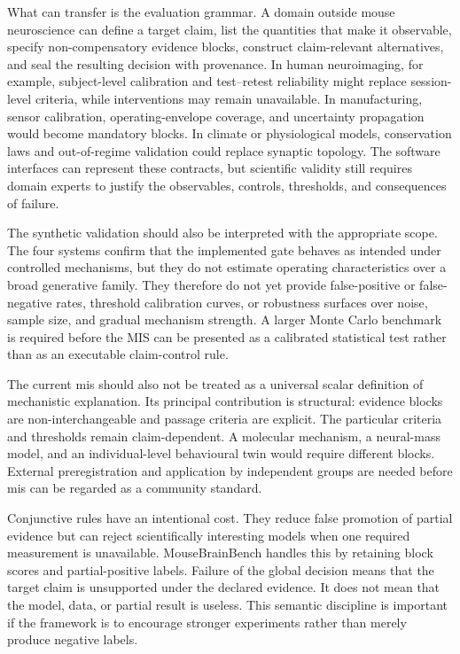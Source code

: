 \documentclass[a4paper,fleqn]{cas-sc}
\begin{document}
What can transfer is the evaluation grammar. A domain outside mouse neuroscience
can define a target claim, list the quantities that make it observable, specify
non-compensatory evidence blocks, construct claim-relevant alternatives, and
seal the resulting decision with provenance. In human neuroimaging, for
example, subject-level calibration and test--retest reliability might replace
session-level criteria, while interventions may remain unavailable. In
manufacturing, sensor calibration, operating-envelope coverage, and uncertainty
propagation would become mandatory blocks. In climate or physiological models,
conservation laws and out-of-regime validation could replace synaptic topology.
The software interfaces can represent these contracts, but scientific validity
still requires domain experts to justify the observables, controls, thresholds,
and consequences of failure.


The synthetic validation should also be interpreted with the appropriate scope. The four systems confirm that the implemented gate behaves as intended under controlled mechanisms, but they do not estimate operating characteristics over a broad generative family. They therefore do not yet provide false-positive or false-negative rates, threshold calibration curves, or robustness surfaces over noise, sample size, and gradual mechanism strength. A larger Monte Carlo benchmark is required before the MIS can be presented as a calibrated statistical test rather than as an executable claim-control rule.

The current \acs{mis} should also not be treated as a universal scalar definition of
mechanistic explanation. Its principal contribution is structural: evidence
blocks are non-interchangeable and passage criteria are explicit. The particular
criteria and thresholds remain claim-dependent. A molecular mechanism, a
neural-mass model, and an individual-level behavioural twin would require
different blocks. External preregistration and application by independent groups
are needed before \acs{mis} can be regarded as a community standard.

Conjunctive rules have an intentional cost. They reduce false promotion of
partial evidence but can reject scientifically interesting models when one
required measurement is unavailable. MouseBrainBench handles this by retaining
block scores and partial-positive labels. Failure of the global decision means
that the target claim is unsupported under the declared evidence. It does not
mean that the model, data, or partial result is useless. This semantic discipline
is important if the framework is to encourage stronger experiments rather than
merely produce negative labels.
\end{document}
